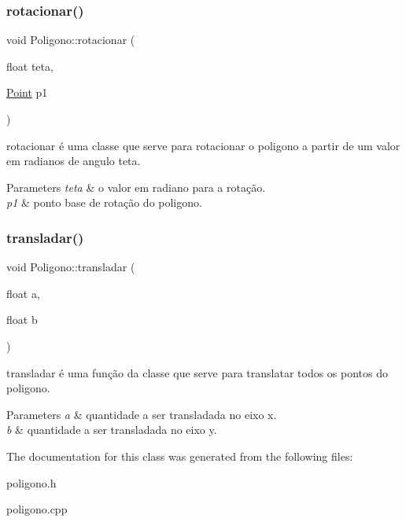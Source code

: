 \subsubsection{\texorpdfstring{rotacionar()}{rotacionar()}}
{\footnotesize\ttfamily void Poligono\+::rotacionar (\begin{DoxyParamCaption}\item[{float}]{teta,  }\item[{\mbox{\hyperlink{class_point}{Point}}}]{p1 }\end{DoxyParamCaption})}



rotacionar é uma classe que serve para rotacionar o poligono a partir de um valor em radianos de angulo teta. 


\begin{DoxyParams}{Parameters}
{\em teta} & o valor em radiano para a rotação. \\
\hline
{\em p1} & ponto base de rotação do poligono. \\
\hline
\end{DoxyParams}
\mbox{\label{class_poligono_a48b40bd2284a5c7ee5253f2070052046}} 
\subsubsection{\texorpdfstring{transladar()}{transladar()}}
{\footnotesize\ttfamily void Poligono\+::transladar (\begin{DoxyParamCaption}\item[{float}]{a,  }\item[{float}]{b }\end{DoxyParamCaption})}



transladar é uma função da classe que serve para translatar todos os pontos do poligono. 


\begin{DoxyParams}{Parameters}
{\em a} & quantidade a ser transladada no eixo x. \\
\hline
{\em b} & quantidade a ser transladada no eixo y. \\
\hline
\end{DoxyParams}


The documentation for this class was generated from the following files\+:\begin{DoxyCompactItemize}
\item 
poligono.\+h\item 
poligono.\+cpp\end{DoxyCompactItemize}
